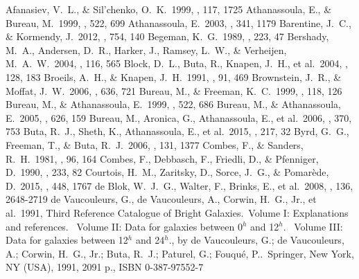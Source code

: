 \documentclass[a4paper,fleqn,usenatbib]{mnras}
\begin{document}
\begin{thebibliography}{99}
 Afanasiev, V.~L., \& Sil'chenko, O.~K.\ 1999, \aj, 117, 1725
 Athanassoula, E., \& Bureau, M.\ 1999, \apj, 522, 699
 Athanassoula, E.\ 2003, \mnras, 341, 1179
 Barentine, J.~C., \& Kormendy, J.\ 2012, \apj, 754, 140
 Begeman, K.~G.\ 1989, \aap, 223, 47
 Bershady, M.~A., Andersen, D.~R., Harker, J., Ramsey, L.~W., \& Verheijen, M.~A.~W.\ 2004, \pasp, 116, 565  
 Block, D.~L., Buta, R., Knapen, J.~H., et al.\ 2004, \aj, 128, 183
 Broeils, A.~H., \& Knapen, J.~H.\ 1991, \aaps, 91, 469
 Brownstein, J.~R., \& Moffat, J.~W.\ 2006, \apj, 636, 721  
 Bureau, M., \& Freeman, K.~C.\ 1999, \aj, 118, 126
 Bureau, M., \& Athanassoula, E.\ 1999, \apj, 522, 686
 Bureau, M., \& Athanassoula, E.\ 2005, \apj, 626, 159
 Bureau, M., Aronica, G., Athanassoula, E., et al.\ 2006, \mnras, 370, 753
 Buta, R.~J., Sheth, K., Athanassoula, E., et al.\ 2015, \apjs, 217, 32
 Byrd, G.~G., Freeman, T., \& Buta, R.~J.\ 2006, \aj, 131, 1377
 Combes, F., \& Sanders, R.~H.\ 1981, \aap, 96, 164
 Combes, F., Debbasch, F., Friedli, D., \& Pfenniger, D.\ 1990, \aap, 233, 82
 Courtois, H.~M., Zaritsky, D., Sorce, J.~G., \& Pomar{\`e}de, D.\ 2015, \mnras, 448, 1767
 de Blok, W.~J.~G., Walter, F., Brinks, E., et al.\ 2008, \aj, 136, 2648-2719
 de Vaucouleurs, G., de Vaucouleurs, A., Corwin, H.~G., Jr., et al.\ 1991, Third Reference Catalogue of Bright Galaxies.~Volume I: Explanations and references.~ Volume II: Data for galaxies between 0$^{h}$ and 12$^{h}$.~ Volume III: Data for galaxies between 12$^{h}$ and 24$^{h}$., by de Vaucouleurs, G.; de Vaucouleurs, A.; Corwin, H.~G., Jr.; Buta, R.~J.; Paturel, G.; Fouqu{\'e}, P..~Springer, New York, NY (USA), 1991, 2091 p., ISBN 0-387-97552-7

\end{thebibliography}
\end{document}
